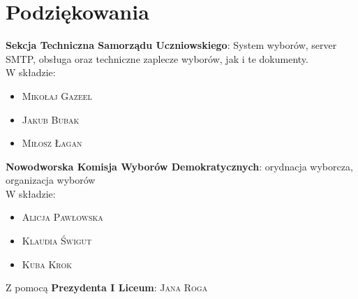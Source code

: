\section{Podziękowania}

\textbf{Sekcja Techniczna Samorządu Uczniowskiego}: System wyborów, server SMTP, obsługa oraz techniczne zaplecze wyborów, jak i te dokumenty.\\[0.3cm] W składzie:

\begin{itemize}
  \item \textsc{Mikołaj Gazeel}
  \item \textsc{Jakub Bubak}
  \item \textsc{Miłosz Łagan}
\end{itemize}

\noindent \textbf{Nowodworska Komisja Wyborów Demokratycznych}: orydnacja wyborcza, organizacja wyborów\\[0.3cm] W składzie:

\begin{itemize}
  \item \textsc{Alicja Pawłowska}
  \item \textsc{Klaudia Świgut}
  \item \textsc{Kuba Krok}
\end{itemize}

\noindent Z pomocą \textbf{Prezydenta I Liceum}: \textsc{Jana Roga}
